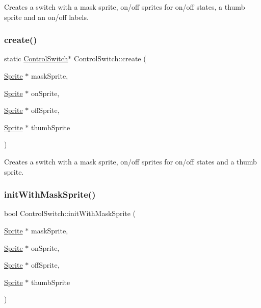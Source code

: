 Creates a switch with a mask sprite, on/off sprites for on/off states, a thumb sprite and an on/off labels. \mbox{\label{classControlSwitch_a4ea8d7c87be7a46441dbc5c22173742f}} 
\subsubsection{\texorpdfstring{create()}{create()}\hspace{0.1cm}{\footnotesize\ttfamily [4/4]}}
{\footnotesize\ttfamily static \hyperlink{classControlSwitch}{Control\+Switch}$\ast$ Control\+Switch\+::create (\begin{DoxyParamCaption}\item[{\hyperlink{classSprite}{Sprite} $\ast$}]{mask\+Sprite,  }\item[{\hyperlink{classSprite}{Sprite} $\ast$}]{on\+Sprite,  }\item[{\hyperlink{classSprite}{Sprite} $\ast$}]{off\+Sprite,  }\item[{\hyperlink{classSprite}{Sprite} $\ast$}]{thumb\+Sprite }\end{DoxyParamCaption})\hspace{0.3cm}{\ttfamily [static]}}

Creates a switch with a mask sprite, on/off sprites for on/off states and a thumb sprite. \mbox{\label{classControlSwitch_a3b67353d399371a96cd4231ba274ff0e}} 
\subsubsection{\texorpdfstring{init\+With\+Mask\+Sprite()}{initWithMaskSprite()}\hspace{0.1cm}{\footnotesize\ttfamily [1/4]}}
{\footnotesize\ttfamily bool Control\+Switch\+::init\+With\+Mask\+Sprite (\begin{DoxyParamCaption}\item[{\hyperlink{classSprite}{Sprite} $\ast$}]{mask\+Sprite,  }\item[{\hyperlink{classSprite}{Sprite} $\ast$}]{on\+Sprite,  }\item[{\hyperlink{classSprite}{Sprite} $\ast$}]{off\+Sprite,  }\item[{\hyperlink{classSprite}{Sprite} $\ast$}]{thumb\+Sprite }\end{DoxyParamCaption})}

